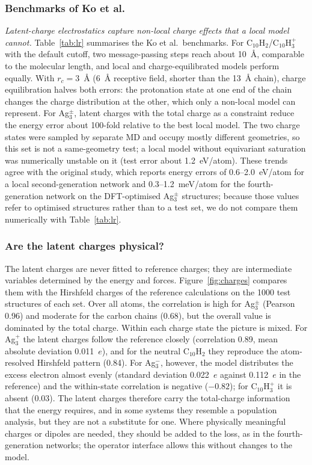\documentclass[journal=jctcce,manuscript=article,layout=traditional]{achemso}
\begin{document}
\subsubsection{Benchmarks of Ko et al.}
\emph{Latent-charge electrostatics capture non-local charge effects that a local model cannot.}
Table~\ref{tab:lr} summarises the Ko et al.\ benchmarks. For C$_{10}$H$_2$/C$_{10}$H$_3^+$ with the default cutoff,
two message-passing steps reach about 10~\AA, comparable to the molecular length, and local and charge-equilibrated
models perform equally. With $r_c=3$~\AA{} (6~\AA{} receptive field, shorter than the 13~\AA{} chain), charge
equilibration halves both errors: the protonation state at one end of the chain changes the charge distribution at
the other, which only a non-local model can represent. For Ag$_3^\pm$, latent charges with the total charge as a
constraint reduce the energy error about 100-fold relative to the best local model. The two charge states were
sampled by separate MD and occupy mostly different geometries, so this set is not a same-geometry test; a local
model without equivariant saturation was numerically unstable on it (test error about 1.2~eV/atom). These trends
agree with the original study\cite{ko2021}, which reports energy errors of 0.6--2.0~eV/atom for a local
second-generation network and 0.3--1.2~meV/atom for the fourth-generation network on the DFT-optimised Ag$_3^\pm$
structures; because those values refer to optimised structures rather than to a test set, we do not compare them
numerically with Table~\ref{tab:lr}.

\subsubsection{Are the latent charges physical?}
The latent charges are never fitted to reference charges; they are intermediate variables determined by the
energy and forces. Figure~\ref{fig:charges} compares them with the Hirshfeld charges of the reference
calculations\cite{ko2021} on the 1000 test structures of each set. Over all atoms, the correlation is high for
Ag$_3^\pm$ (Pearson 0.96) and moderate for the carbon chains (0.68), but the overall value is dominated by the total
charge. Within each charge state the picture is mixed. For Ag$_3^+$ the latent charges follow the reference closely
(correlation 0.89, mean absolute deviation 0.011~$e$), and for the neutral C$_{10}$H$_2$ they reproduce the
atom-resolved Hirshfeld pattern (0.84). For Ag$_3^-$, however, the model distributes the excess
electron almost evenly (standard deviation 0.022~$e$ against 0.112~$e$ in the reference) and the within-state
correlation is negative ($-0.82$); for C$_{10}$H$_3^+$ it is absent (0.03). The latent charges therefore carry the
total-charge information that the energy requires, and in some systems they resemble a population analysis, but
they are not a substitute for one. Where physically meaningful charges or dipoles are needed, they should be added
to the loss, as in the fourth-generation networks\cite{ko2021}; the operator interface allows this without changes
to the model.
\end{document}
